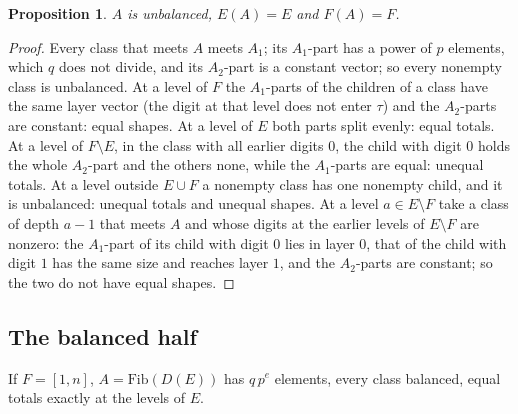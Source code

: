 \documentclass[11pt,a4paper]{amsart}
\newtheorem{proposition}[theorem]{Proposition}
\theoremstyle{definition}
\theoremstyle{remark}
\begin{document}
\begin{proposition}\label{prop:CU}
$A$ is unbalanced, $E(A)=E$ and $F(A)=F$.
\end{proposition}
\begin{proof}
Every class that meets $A$ meets $A_1$; its $A_1$-part has a power of $p$ elements, which $q$ does not
divide, and its $A_2$-part is a constant vector; so every nonempty class is unbalanced. At a level of $F$ the
$A_1$-parts of the children of a class have the same layer vector (the digit at that level does not enter
$\tau$) and the $A_2$-parts are constant: equal shapes. At a level of $E$ both parts split evenly: equal
totals. At a level of $F\setminus E$, in the class with all earlier digits $0$, the child with digit $0$
holds the whole $A_2$-part and the others none, while the $A_1$-parts are equal: unequal totals. At a level
outside $E\cup F$ a nonempty class has one nonempty child, and it is unbalanced: unequal totals and unequal
shapes. At a level $a\in E\setminus F$ take a class of depth $a-1$ that meets $A$ and whose digits at the
earlier levels of $E\setminus F$ are nonzero: the $A_1$-part of its child with digit $0$ lies in layer $0$,
that of the child with digit $1$ has the same size and reaches layer $1$, and the $A_2$-parts are constant;
so the two do not have equal shapes.
\end{proof}

\subsection{The balanced half} If $F=[1,n]$, $A=\mathrm{Fib}(D(E))$ has $q\,p^e$ elements, every class
balanced, equal totals exactly at the levels of $E$.
\end{document}
